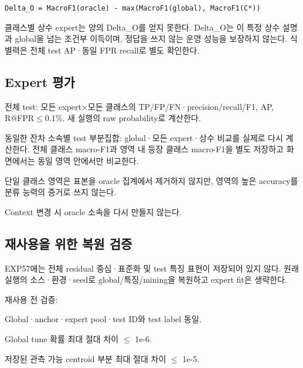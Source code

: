 \texttt{Delta\_\allowbreak{}\allowbreak{}O \allowbreak{}=\allowbreak{}\allowbreak{} MacroF\allowbreak{}1(oracle\allowbreak{}) -\allowbreak{} max(\allowbreak{}MacroF1(\allowbreak{}global),\allowbreak{} MacroF1\allowbreak{}(C*))}

클래스별 상수 expert는 양의 Delta\_\allowbreak{}O를 얻지 못한다. Delta\_\allowbreak{}O는 이 특정 상수 설명과 global을 넘는 조건부 이득이며, 정답을 쓰지 않는 운영 성능을 보장하지 않는다. 식별력은 전체 test AP·동일 FPR recall로 별도 확인한다.

\subsection{Expert 평가}
\par\noindent \textbullet\enspace 전체 test: 모든 expert×모든 클래스의 TP/\allowbreak{}FP/\allowbreak{}FN·precision/\allowbreak{}recall/\allowbreak{}F1, AP, R@FPR\ensuremath{\leq}0.1\%. 새 실행의 raw probability로 계산한다.


\par\noindent \textbullet\enspace 동일한 잔차 소속별 test 부분집합: global·모든 expert·상수 비교를 실제로 다시 계산한다. 전체 클래스 macro-F1과 영역 내 등장 클래스 macro-F1을 별도 저장하고 화면에서는 동일 영역 안에서만 비교한다.


\par\noindent \textbullet\enspace 단일 클래스 영역은 표본을 oracle 집계에서 제거하지 않지만, 영역의 높은 accuracy를 분류 능력의 증거로 쓰지 않는다.


\par\noindent \textbullet\enspace Context 변경 시 oracle 소속을 다시 만들지 않는다.


\subsection{재사용을 위한 복원 검증}
EXP57에는 전체 residual 중심·표준화 및 test 특징 표현이 저장되어 있지 않다. 원래 실행의 소스·환경·seed로 global/\allowbreak{}특징/\allowbreak{}mining을 복원하고 expert fit은 생략한다.

재사용 전 검증:

\par\noindent \textbullet\enspace Global·anchor·expert pool·test ID와 test label 동일.


\par\noindent \textbullet\enspace Global tune 확률 최대 절대 차이 \ensuremath{\leq} 1e-6.


\par\noindent \textbullet\enspace 저장된 관측 가능 centroid 부분 최대 절대 차이 \ensuremath{\leq} 1e-5.


